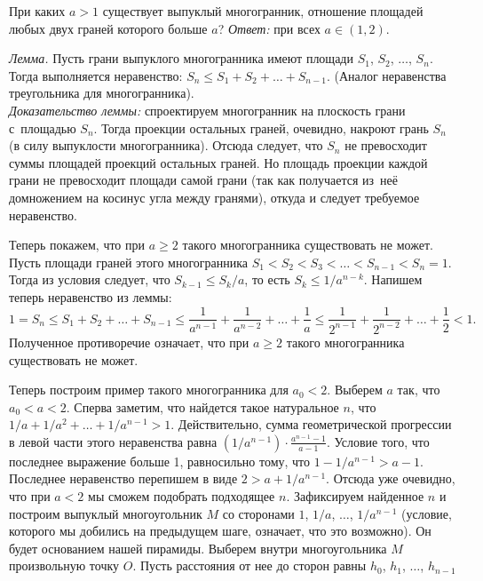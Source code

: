 \problem
При каких $a > 1$ существует выпуклый многогранник, отношение площадей любых
двух граней которого больше $a$?
\solution
\emph{Ответ:} при всех $a \in (1, 2)$.
\par
\emph{Лемма.}
Пусть грани выпуклого многогранника имеют площади
$S_1$, $S_2$, $\ldots$, $S_n$.
Тогда выполняется неравенство: $S_n \leq S_1 + S_2 + \ldots + S_{n-1}$.
(Аналог неравенства треугольника для многогранника).
\\\emph{Доказательство леммы:}
спроектируем многогранник на плоскость грани с~площадью $S_n$.
Тогда проекции остальных граней, очевидно, накроют грань $S_n$
(в силу выпуклости многогранника).
Отсюда следует, что $S_n$ не превосходит суммы площадей проекций остальных
граней.
Но площадь проекции каждой грани не превосходит площади самой грани
(так как получается из~неё домножением на косинус угла между гранями),
откуда и следует требуемое неравенство.
\par
Теперь покажем, что при $a \geq 2$ такого многогранника существовать не может.
Пусть площади граней этого многогранника
$S_1 < S_2 < S_3 < \ldots < S_{n-1} < S_n = 1$.
Тогда из условия следует, что $S_{k-1} \leq S_k / a$, то есть
$S_k \leq 1 / a^{n-k}$.
Напишем теперь неравенство из леммы:
\[
    1
=
    S_n \leq S_1 + S_2 + \ldots + S_{n-1}
\leq
    \frac{1}{a^{n-1}} + \frac{1}{a^{n-2}}
    + \ldots +
    \frac{1}{a}
\leq
    \frac{1}{2^{n-1}} + \frac{1}{2^{n-2}}
    + \ldots +
    \frac{1}{2}
<
    1
.\]
Полученное противоречие означает, что при $a \geq 2$ такого
многогранника существовать не может.
\par
Теперь построим пример такого многогранника для $a_0 < 2$.
Выберем $a$ так, что $a_0 < a < 2$.
Сперва заметим, что найдется такое натуральное $n$, что
$1 / a + 1 / a^2 + \ldots + 1 / a^{n-1} > 1$.
Действительно, сумма геометрической прогрессии в левой части этого неравенства
равна $(1 / a^{n-1}) \cdot \frac{a^{n-1} - 1}{a - 1}$.
Условие того, что последнее выражение больше 1, равносильно тому, что
$1 - 1 / a^{n-1} > a - 1$.
Последнее неравенство перепишем в виде $2 > a + 1 / a^{n-1}$.
Отсюда уже очевидно, что при $a < 2$ мы сможем подобрать подходящее $n$.
Зафиксируем найденное $n$ и построим выпуклый многоугольник $M$ со сторонами
$1$, $1 / a$, $\ldots$, $1 / a^{n-1}$
(условие, которого мы добились на предыдущем шаге, означает, что это возможно).
Он будет основанием нашей пирамиды.
Выберем внутри многоугольника $M$ произвольную точку $O$.
Пусть расстояния от нее до сторон равны $h_0$, $h_1$, $\ldots$, $h_{n-1}$
